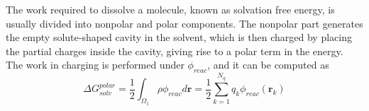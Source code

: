 The work required to dissolve a molecule, known as solvation free energy, is usually divided into nonpolar and polar components.
The nonpolar part generates the empty solute-shaped cavity in the solvent, which is then charged by placing the partial charges inside the cavity, giving rise to a polar term in the energy. 
The work in charging is performed under $\phi_{reac}$, and it can be computed as
%
\begin{equation} \label{eq:energy}
\Delta G^{polar}_{solv} = \frac{1}{2}\int_{\Omega_1} \rho\phi_{reac}d\mathbf{r} = \frac{1}{2}\sum_{k=1}^{N_q}q_k\phi_{reac}(\mathbf{r}_k)
\end{equation}
